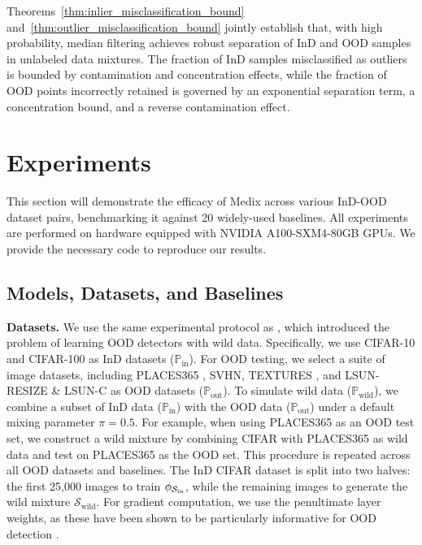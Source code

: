 \documentclass[10pt]{article} %
\theoremstyle{plain}
\theoremstyle{definition}
\begin{document}
\begin{tcolorbox}[
  colback=boxyellow,
  colbacktitle=BoxTitleYellow,
  coltitle=black,
  colframe=boxyellowframe,
  arc=1.5pt,
  boxrule=1pt,
    left=6pt,right=6pt,top=6pt,bottom=6pt,
    breakable
]
Theorems~\ref{thm:inlier_misclassification_bound} and~\ref{thm:outlier_misclassification_bound} jointly establish that, with high probability, median filtering achieves robust separation of InD and OOD samples in unlabeled data mixtures. The fraction of InD samples misclassified as outliers is bounded by contamination and concentration effects, while the fraction of OOD points incorrectly retained is governed by an exponential separation term, a concentration bound, and a reverse contamination effect.
\end{tcolorbox}



\section{Experiments}   \label{sec:experiments}
This section will demonstrate the efficacy of Medix across various InD-OOD dataset pairs, benchmarking it against 20 widely-used baselines. All experiments are performed on hardware equipped with  NVIDIA A100-SXM4-80GB GPUs. We provide the necessary code to reproduce our results.

\subsection{Models, Datasets, and Baselines}
\textbf{Datasets.}
We use the same experimental protocol as \citet{pmlr-v162-katz-samuels22a}, which introduced the problem of learning OOD detectors with wild data. Specifically, we use CIFAR-10 and CIFAR-100 as InD datasets (\( \mathbb{P}_{\text{in}}\)). For OOD testing, we select a suite of image datasets, including PLACES365 \citep{zhou2017PLACES}, SVHN, TEXTURES \citep{cimpoi2014describing}, and LSUN-RESIZE \& LSUN-C \citep{yu2015lsun} as OOD datasets (\( \mathbb{P}_{\text{out}} \)).
To simulate wild data (\( \mathbb{P}_{\text{wild}} \)), we combine a subset of InD data (\( \mathbb{P}_{\text{in}} \)) with the OOD data (\( \mathbb{P}_{\text{out}} \)) under a default mixing parameter \( \pi = 0.5 \). For example, when using PLACES365 as an OOD test set, we construct a wild mixture by combining CIFAR with PLACES365 as wild data and test on PLACES365 as the OOD set. This procedure is repeated across all OOD datasets and baselines.
The InD CIFAR dataset is split into two halves: the first 25,000 images to train $\phi_{\mathcal{S}_{\rm in}}$, while the remaining images to generate the wild mixture $\mathcal{S}_{\text{wild}}$. For gradient computation, we use the penultimate layer weights, as these have been shown to be particularly informative for OOD detection \citep{huang2021importance}.
\end{document}
